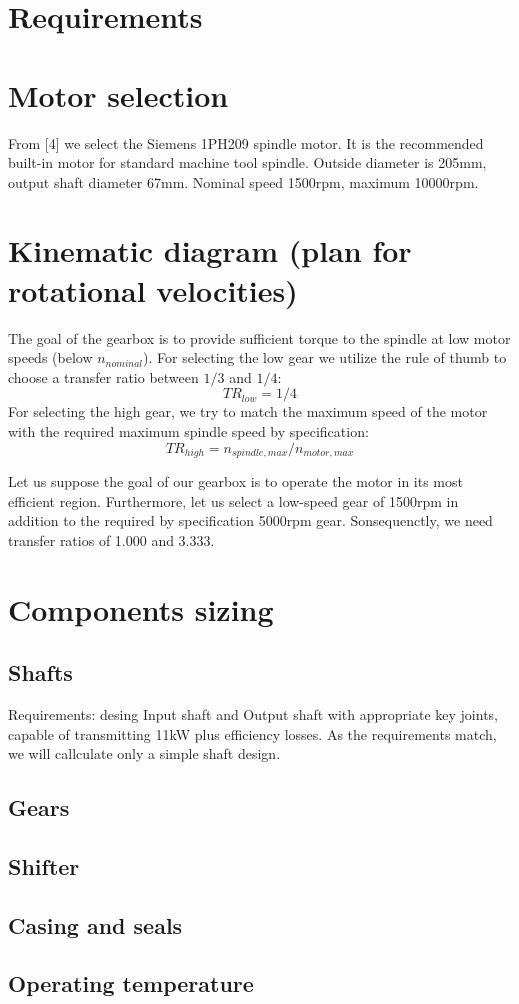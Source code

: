 \documentclass{article}
\begin{document}
\section{Requirements}


\section{Motor selection}
From [4] we select the Siemens 1PH209 spindle motor.
It is the recommended built-in motor for standard machine tool spindle.
Outside diameter is 205mm, output shaft diameter 67mm.
Nominal speed 1500rpm, maximum 10000rpm.

\section{Kinematic diagram (plan for rotational velocities)}
The goal of the gearbox is to provide sufficient torque to the spindle at low motor speeds (below $n_{nominal}$).
For selecting the low gear we utilize the rule of thumb to choose a transfer ratio between $1/3$ and $1/4$:
$$ TR_{low} = 1/4 $$
For selecting the high gear, we try to match the maximum speed of the motor with the required maximum spindle speed by specification:
$$ TR_{high} = n_{spindle, max} / n_{motor, max} $$

Let us suppose the goal of our gearbox is to operate the motor in its most efficient region.
Furthermore, let us select a low-speed gear of 1500rpm in addition to the required by specification 5000rpm gear.
Sonsequenctly, we need transfer ratios of 1.000 and 3.333.

\section{Components sizing}
\subsection{Shafts}
Requirements: desing Input shaft and Output shaft with appropriate key joints, capable of transmitting 11kW plus efficiency losses.
As the requirements match, we will callculate only a simple shaft design.


\FPeval{}
\vExample

\subsection{Gears}
\subsection{Shifter}
\subsection{Casing and seals}
\subsection{Operating temperature}
\end{document}
